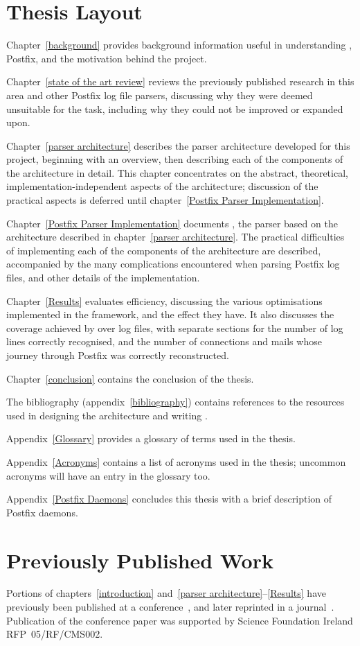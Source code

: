 \section{Thesis Layout}

Chapter~\ref{background} provides background information useful in
understanding , Postfix, and the motivation behind the
project.

Chapter~\ref{state of the art review} reviews the previously published
research in this area and other Postfix log file parsers, discussing why
they were deemed unsuitable for the task, including why they could not be
improved or expanded upon.

Chapter~\ref{parser architecture} describes the parser architecture
developed for this project, beginning with an overview, then describing
each of the components of the architecture in detail.  This chapter
concentrates on the abstract, theoretical, implementation-independent
aspects of the architecture; discussion of the practical aspects is
deferred until chapter~\ref{Postfix Parser Implementation}.

Chapter~\ref{Postfix Parser Implementation} documents \parsername{}, the
parser based on the architecture described in chapter~\ref{parser
architecture}.  The practical difficulties of implementing each of the
components of the architecture are described, accompanied by the many
complications encountered when parsing Postfix log files, and other details
of the implementation.

Chapter~\ref{Results} evaluates \parsernames{} efficiency, discussing the
various optimisations implemented in the framework, and the effect they
have.  It also discusses the coverage achieved by \parsername{} over
\numberOFlogFILES{} log files, with separate sections for the number of log
lines correctly recognised, and the number of connections and mails whose
journey through Postfix was correctly reconstructed.

Chapter~\ref{conclusion} contains the conclusion of the thesis.

The bibliography (appendix~\ref{bibliography}) contains references to the
resources used in designing the architecture and writing \parsername{}.

Appendix~\ref{Glossary} provides a glossary of terms used in the thesis.

Appendix~\ref{Acronyms} contains a list of acronyms used in the thesis;
uncommon acronyms will have an entry in the glossary too.

Appendix~\ref{Postfix Daemons} concludes this thesis with a brief
description of Postfix daemons.

\section{Previously Published Work}

Portions of chapters~\ref{introduction} and~\ref{parser
architecture}--\ref{Results} have previously been published at a
conference~\cite{sgai-2008}, and later reprinted in a
journal~\cite{elsevier-2009}.  Publication of the conference paper was
supported by Science Foundation Ireland RFP~05/RF/CMS002.
